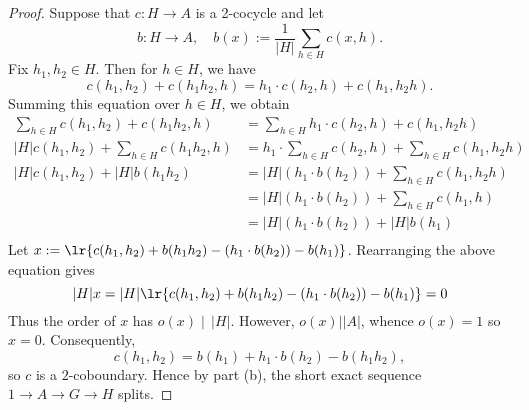 \documentclass[12pt]{article}
\begin{document}
\begin{homeworkProblem}
\begin{proof}
    Suppose that $ c:H\to A $ is a 2-cocycle and let 
    \[
    b : H \to A, \quad b(x) := \frac{1}{\lvert H\rvert} \sum_{h \in H} c(x, h).
  \]
  Fix $ h_{1},h_{2}\in H $. Then for $ h\in H $, we have 
  \[
    c(h_{1},h_{2})+ c(h_{1}h_{2},h) = h_{1}\cdot c(h_{2},h) + c(h_{1},h_{2}h).
  \]
  Summing this equation over $ h\in H $, we obtain
  \begin{align*}
    \sum_{h\in H}c(h_{1},h_{2})+ c(h_{1}h_{2},h) &= \sum_{h\in H}h_{1}\cdot c(h_{2},h) + c(h_{1},h_{2}h)   \\
|H|c(h_{1},h_{2})+ \sum_{h\in H}c(h_{1}h_{2},h)&= h_{1}\cdot \sum_{h\in H}c(h_{2},h) + \sum_{h\in H} c(h_{1},h_{2}h)   \\
|H| c(h_{1},h_{2})+ |H|b(h_{1}h_{2})&= |H|(h_{1}\cdot b(h_{2})) + \sum_{h\in H} c(h_{1},h_{2}h)   \\
&= |H|(h_{1}\cdot b(h_{2})) + \sum_{h\in H} c(h_{1},h)   \\
&= |H|(h_{1}\cdot b(h_{2})) + |H|b(h_{1})   \\
  \end{align*}
  Let $ x:=\lr{c(h_{1},h_{2}) +b(h_{1}h_{2}) - (h_{1}\cdot b(h_{2})) - b(h_{1})} $. Rearranging the above equation gives
  \[
    |H|x = |H|\lr{c(h_{1},h_{2}) +b(h_{1}h_{2}) - (h_{1}\cdot b(h_{2})) - b(h_{1})} = 0
  \]
  Thus the order of $ x $ has $ o(x)\mid\, |H| $. However, $ o(x)| |A| $, whence $ o(x) = 1 $ so $ x = 0 $. Consequently,
  \[
    c(h_{1},h_{2}) = b(h_{1})+h_{1}\cdot b(h_{2}) - b(h_{1}h_{2}),
  \]
  so $ c $ is a $ 2 $-coboundary. Hence by part (b), the short exact sequence $ 1\to A \to G\to H $ splits.

  \end{proof}

\end{homeworkProblem}
\end{document}
